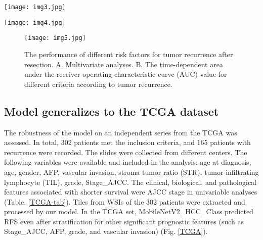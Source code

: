 \documentclass{article}
\begin{document}
\begin{figure*}[t]
	\centerline{\texttt{[image: img3.jpg]}}
	\caption{The performance of different risk factors for tumor recurrence after LT. A. Multivariate analyses. B. The time-dependent area under the receiver operating characteristic curve (AUC) value for different criteria according to tumor recurrence.}
	\label{risk}
\end{figure*}

\begin{figure*}[h]
	\centerline{\texttt{[image: img4.jpg]}}
	\caption{Prognostic of MobileNetV2\_HCC\_Class in the whole TCGA set and after stratification for common baseline variables. The MobileNetV2\_HCC\_Class predict RFS after stratification for common baseline variables.}
	\label{TCGA}
\end{figure*}

\begin{figure}[h]
	\centerline{\texttt{[image: img5.jpg]}}
	\caption{The performance of different risk factors for tumor recurrence after resection. A. Multivariate analyses. B. The time-dependent area under the receiver operating characteristic curve (AUC) value for different criteria according to tumor recurrence.}
	\label{TCGA_risk}
\end{figure}

\subsection{Model generalizes to the TCGA dataset}
The robustness of the model on an independent series from the TCGA was assessed. In total, 302 patients met the inclusion criteria, and 165 patients with recurrence were recorded. The slides were collected from different centers. The following variables were available and included in the analysis: age at diagnosis, age, gender, AFP, vascular invasion, stroma tumor ratio (STR), tumor-infiltrating lymphocyte (TIL), grade, Stage\_AJCC. The clinical, biological, and pathological features associated with shorter survival were AJCC stage in univariable analyses (Table. \ref{TCGA-tab}). Tiles from WSIs of the 302 patients were extracted and processed by our model. In the TCGA set, MobileNetV2\_HCC\_Class predicted RFS even after stratification for other significant prognostic features (such as Stage\_AJCC, AFP, grade, and vascular invasion) (Fig. \ref{TCGA}).
\end{document}
